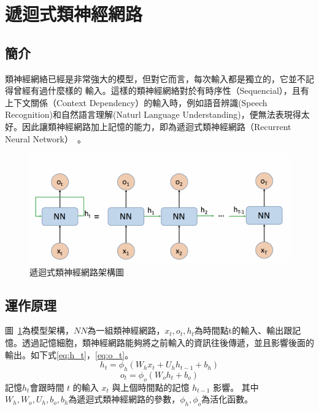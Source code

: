 \section{遞迴式類神經網路}
\subsection{簡介}
類神經網絡已經是非常強大的模型，但對它而言，每次輸入都是獨立的，它並不記得曾經有過什麼樣的
輸入。這樣的類神經網絡對於有時序性（Sequencial），且有上下文關係（Context
Dependency）的輸入時，例如語音辨識(Speech Recognition)和自然語言理解(Naturl
Language Understanding)，便無法表現得太好。因此讓類神經網路加上記憶的能力，即為遞迴式類神經網路（Recurrent
Neural Network）~\cite{elman1990finding}。

\begin{figure}[h]
\centering
\includegraphics[scale=0.5]{images/ch2_RNN.png}
\caption{遞迴式類神經網路架構圖} \label{fig:ch2_RNN}
\end{figure}
\subsection{運作原理}
	圖~\ref{fig:ch2_RNN}為模型架構，$NN$為一組類神經網路，$x_t,o_t,h_t$為時間點t的輸入、輸出跟記憶。透過記憶細胞，類神經網路能夠將之前輸入的資訊往後傳遞，並且影響後面的輸出。如下式\ref{eq:h_t}，\ref{eq:o_t}。
\begin{equation}
\label{eq:h_t}
h_t = \phi_h{(W_h x_t+U_h h_{t-1}+b_h)}
\end{equation}
\begin{equation}
\label{eq:o_t}
o_t = \phi_o{(W_o h_t+b_o)}
\end{equation}
記憶$h_t$會跟時間 $t$ 的輸入 $x_t$ 與上個時間點的記憶 $h_{t-1}$ 影響。
其中$W_h,W_o,U_h,b_o,b_h$為遞迴式類神經網路的參數，$\phi_h,\phi_o$為活化函數。



